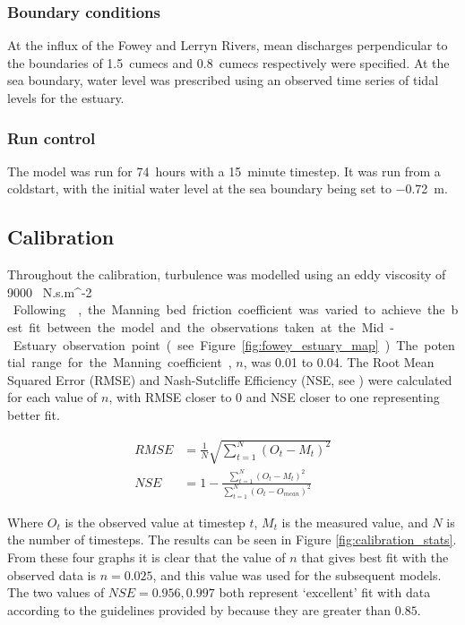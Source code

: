 \documentclass{article}
\begin{document}
\subsubsection{Boundary conditions}
At the influx of the Fowey and Lerryn Rivers, mean discharges perpendicular to the boundaries of \SI{1.5}{cumecs} and \SI{0.8}{cumecs} respectively were specified. At the sea boundary, water level was prescribed using an observed time series of tidal levels for the estuary.

\subsubsection{Run control}
The model was run for \SI{74}{hours} with a \SI{15}{minute} timestep. It was run from a coldstart, with the initial water level at the sea boundary being set to \SI{-0.72}{m}. 

\subsection{Calibration}

Throughout the calibration, turbulence was modelled using an eddy viscosity of \SI{9000}{ N.s.m^{-2} }.
Following \textcite{piedra2007residual, sousa2007hydrodynamic}, the  Manning bed friction coefficient was varied to achieve the best fit between the model and the observations taken at the Mid-Estuary observation point (see Figure \ref{fig:fowey_estuary_map}). The potential range for the Manning coefficient, $n$, was 0.01 to 0.04. The Root Mean Squared Error (RMSE) and Nash-Sutcliffe Efficiency (NSE, see \textcite{nash1970river}) were calculated for each value of $n$, with RMSE closer to 0 and NSE closer to one representing better fit.

\begin{align*}
    RMSE &= \frac{1}{N} \sqrt{ \sum_{t = 1}^N ( O_t - M_t) ^ 2 }\\
    NSE  &= 1 - \frac{\sum_{t = 1}^N ( O_t - M_t) ^ 2 }{\sum_{t = 1}^N ( O_t - O_{mean}) ^ 2 }
\end{align*}

Where $O_t$ is the observed value at timestep $t$, $M_t$ is the measured value, and $N$ is the number of timesteps. The results can be seen in Figure \ref{fig:calibration_stats}. From these four graphs it is clear that the value of $n$ that gives best fit with the observed data is $n = 0.025$, and this value was used for the subsequent models. The two values of $NSE = 0.956, 0.997$ both represent `excellent' fit with data according to the guidelines provided by \textcite{henriksen2008assessment} because they are greater than $0.85$. 
\end{document}
